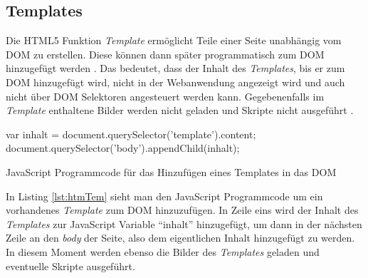 \documentclass[12pt, paper=a4, bibtotoc, toc=listof, headsepline=true, numbers=endperiod]{scrreprt}
\begin{document}
		\subsection{Templates}
		\label{subsec:Templates}
		Die \ac{HTML5} Funktion \emph{Template} ermöglicht Teile einer Seite unabhängig vom \ac{DOM} zu erstellen. Diese können dann später programmatisch zum \ac{DOM} hinzugefügt werden \cite[S.177]{Cameron2015}. Das bedeutet, dass der Inhalt des \emph{Templates}, bis er zum \ac{DOM} hinzugefügt wird, nicht in der Webanwendung angezeigt wird und auch nicht über \ac{DOM} Selektoren angesteuert werden kann. Gegebenenfalls im \emph{Template} enthaltene Bilder werden nicht geladen und Skripte nicht ausgeführt \cite{Potschien2013}.
		\begin{listing}
			\begin{JavaScriptcode*}{}
var inhalt = document.querySelector('template').content;
document.querySelector('body').appendChild(inhalt);
			\end{JavaScriptcode*}
			\caption[Hinzufügen eines Templates]{JavaScript Programmcode für das Hinzufügen eines Templates in das DOM}
			\label{lst:htmTem}
		\end{listing}\noindent
		In Listing \ref{lst:htmTem} sieht man den JavaScript Programmcode um ein vorhandenes \emph{Template} zum \ac{DOM} hinzuzufügen. In Zeile eins wird der Inhalt des \emph{Templates} zur JavaScript Variable \enquote{inhalt} hinzugefügt, um dann in der nächsten Zeile an den \emph{body} der Seite, also dem eigentlichen Inhalt hinzugefügt zu werden. In diesem Moment werden ebenso die Bilder des \emph{Templates} geladen und eventuelle Skripte ausgeführt.
\end{document}
